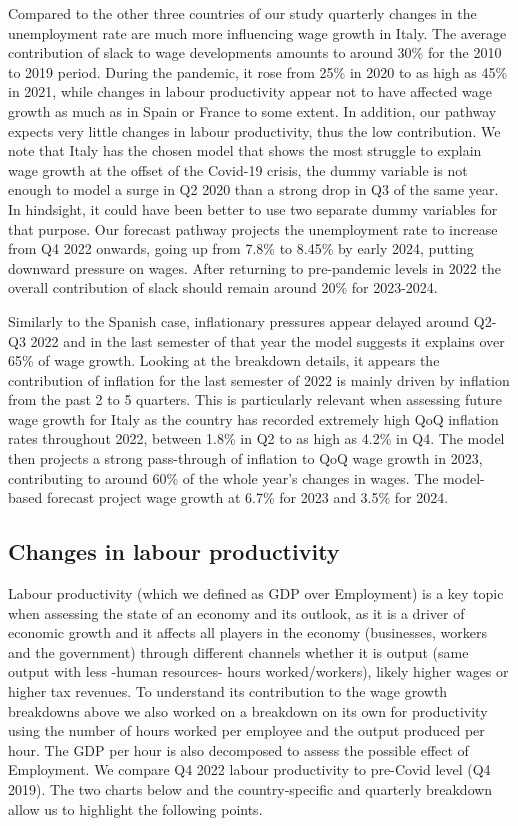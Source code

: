 Compared to the other three countries of our study quarterly changes in the unemployment rate are much more influencing wage growth in Italy. 
The average contribution of slack to wage developments amounts to around 30\% for the 2010 to 2019 period. 
During the pandemic, it rose from 25\% in 2020 to as high as 45\% in 2021, while changes in labour productivity appear not to have affected wage growth as much as in Spain or France to some extent. 
In addition, our pathway expects very little changes in labour productivity, thus the low contribution. 
We note that Italy has the chosen model that shows the most struggle to explain wage growth at the offset of the Covid-19 crisis, the dummy variable is not enough to model a surge in Q2 2020 than a strong drop in Q3 of the same year. 
In hindsight, it could have been better to use two separate dummy variables for that purpose. 
Our forecast pathway projects the unemployment rate to increase from Q4 2022 onwards, going up from 7.8\% to 8.45\% by early 2024, putting downward pressure on wages. 
After returning to pre-pandemic levels in 2022 the overall contribution of slack should remain around 20\% for 2023-2024. 

Similarly to the Spanish case, inflationary pressures appear delayed around Q2-Q3 2022 and in the last semester of that year the model suggests it explains over 65\% of wage growth. 
Looking at the breakdown details, it appears the contribution of inflation for the last semester of 2022 is mainly driven by inflation from the past 2 to 5 quarters. 
This is particularly relevant when assessing future wage growth for Italy as the country has recorded extremely high QoQ inflation rates throughout 2022, between 1.8\% in Q2 to as high as 4.2\% in Q4. 
The model then projects a strong pass-through of inflation to QoQ wage growth in 2023, contributing to around 60\% of the whole year's changes in wages. 
The model-based forecast project wage growth at 6.7\% for 2023 and 3.5\% for 2024.

\subsection{Changes in labour productivity}

Labour productivity (which we defined as GDP over Employment) is a key topic when assessing the state of an economy and its outlook, as it is a driver of economic growth and it affects all players in the economy (businesses, workers and the government) through different channels whether it is output (same output with less -human resources- hours worked/workers), likely higher wages or higher tax revenues. 
To understand its contribution to the wage growth breakdowns above we also worked on a breakdown on its own for productivity using the number of hours worked per employee and the output produced per hour. 
The GDP per hour is also decomposed to assess the possible effect of Employment. We compare Q4 2022 labour productivity to pre-Covid level (Q4 2019). 
The two charts below and the country-specific and quarterly breakdown allow us to highlight the following points. 

